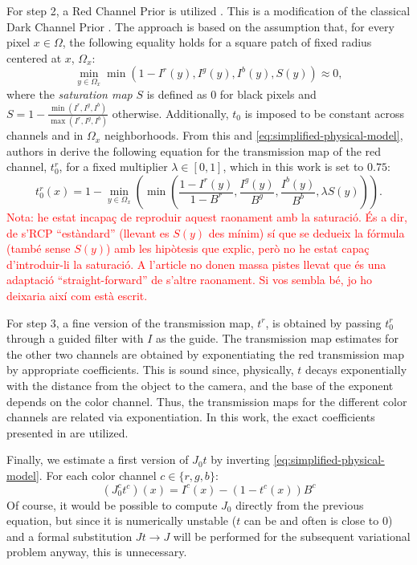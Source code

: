 \documentclass[twocolumn,twoside,a4paper,10pt]{IEEEtran}
\newcommand{\Frank}[1]{\textcolor{red}{#1}}
\begin{document}
For step 2, a Red Channel Prior is utilized \cite{GALDRAN2015132}. This is a
modification of the classical Dark Channel Prior \cite{5206515}. The
approach is based on the assumption that, for every pixel \(x\in\Omega\), the following equality holds for a square patch of fixed radius centered at \(x\), \(\Omega_x\):
\[
  \min_{y\in\Omega_x}\min(1-I^r(y), I^g(y), I^b(y), S(y)) \approx 0
,\]
where the \textit{saturation map} \(S\) is defined as \(0\) for black pixels and \(S=1-\frac{\min(I^r, I^g, I^b)}{\max(I^r, I^g, I^b)}\) otherwise.
Additionally, \(t_0\) is imposed to be constant across channels and in \(\Omega_x\) neighborhoods. From this and \cref{eq:simplified-physical-model}, authors in \cite{GALDRAN2015132} derive the following equation for the transmission map of the red channel, \(t_0^r\), for a fixed multiplier \(\lambda\in[0,1]\), which in this work is set to \(0.75\):
\[
  t_0^r(x) = 1 - \min_{y\in\Omega_x}\left(\min\left(\frac{1-I^r(y)}{1-B^r}, \frac{I^g(y)}{B^g}, \frac{I^b(y)}{B^b}, \lambda S(y)\right)\right)
.\]
\Frank{Nota: he estat incapaç de reproduir aquest raonament amb la saturació. És a dir, de s'RCP ``estàndard'' (llevant es \(S(y)\) des mínim) sí que se dedueix la fórmula (també sense \(S(y)\)) amb les hipòtesis que explic, però no he estat capaç d'introduir-li la saturació. A l'article no donen massa pistes llevat que és una adaptació ``straight-forward'' de s'altre raonament. Si vos sembla bé, jo ho deixaria així com està escrit.}

For step 3, a fine version of the transmission map, \(t^r\), is obtained by passing \(t_0^r\) through a guided filter \cite{6319316} with \(I\) as the guide. The transmission map estimates for the other two channels are obtained by
exponentiating the red transmission map by appropriate coefficients. This is sound since, physically, \(t\) decays exponentially with the distance from the object to the camera, and the base of the exponent depends on the color channel. Thus, the transmission maps for the different color channels are related via exponentiation. In this work, the exact coefficients presented in \cite{7574330} are utilized.

Finally, we estimate a first version of \(J_0t\) by inverting \cref{eq:simplified-physical-model}. For each color channel \(c\in\{r, g, b\}\):
\begin{equation}\label{eq:J0}
  (J^c_0t^c)(x) = I^c(x) - (1-t^c(x))B^c
\end{equation}
Of course, it would be possible to compute \(J_0\) directly from the previous equation, but since it is numerically unstable (\(t\) can be and often is close to \(0\)) and a formal substitution \(Jt\to J\) will be performed for the subsequent variational problem anyway, this is unnecessary.
\end{document}
